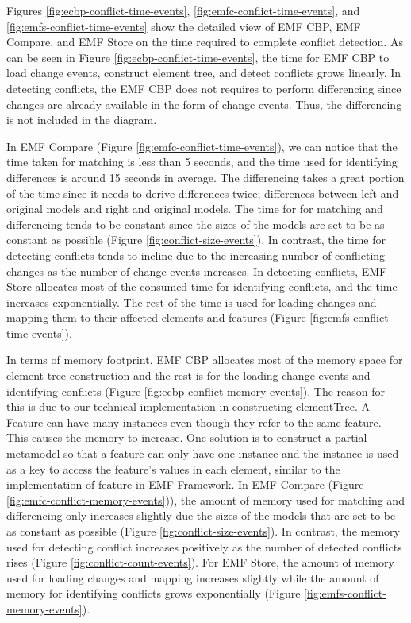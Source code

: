 Figures \ref{fig:ecbp-conflict-time-events}, \ref{fig:emfc-conflict-time-events}, and \ref{fig:emfs-conflict-time-events} show the detailed view of EMF CBP, EMF Compare, and EMF Store on the time required to complete conflict detection. As can be seen in Figure \ref{fig:ecbp-conflict-time-events}, the time for EMF CBP to load change events, construct element tree, and detect conflicts grows linearly. In detecting conflicts, the EMF CBP does not requires to perform differencing since changes are already available in the form of change events. Thus, the differencing is not included in the diagram. 

In EMF Compare (Figure \ref{fig:emfc-conflict-time-events}), we can notice that the time taken for matching is less than 5 seconds, and the time used for identifying differences is around 15 seconds in average. The differencing takes a great portion of the time since it needs to derive differences twice; differences between left and original models and right and original models. The time for for matching and differencing tends to be constant since the sizes of the models are set to be as constant as possible (Figure \ref{fig:conflict-size-events}). In contrast, the time for detecting conflicts tends to incline due to the increasing number of conflicting changes as the number of change events increases. In detecting conflicts, EMF Store allocates most of the consumed time for identifying conflicts, and the time increases exponentially. The rest of the time is used for loading changes and mapping them to their affected elements and features (Figure \ref{fig:emfs-conflict-time-events}). 

In terms of memory footprint, EMF CBP allocates most of the memory space for element tree construction and the rest is for the loading change events and identifying conflicts (Figure \ref{fig:ecbp-conflict-memory-events}). The reason for this is due to our technical implementation in constructing \textsf{elementTree}. A Feature can have many instances even though they refer to the same feature. This causes the memory to increase. One solution is to construct a partial metamodel so that a feature can only have one instance and the instance is used as a key to access the feature's values in each element, similar to the implementation of feature in EMF Framework. In EMF Compare (Figure \ref{fig:emfc-conflict-memory-events})), the amount of memory used for matching and differencing only increases slightly due the sizes of the models that are set to be as constant as possible (Figure \ref{fig:conflict-size-events}). In contrast, the memory used for detecting conflict increases positively as the number of detected conflicts rises (Figure \ref{fig:conflict-count-events}). For EMF Store, the amount of memory used for loading changes and mapping increases slightly while the amount of memory for identifying conflicts grows exponentially (Figure \ref{fig:emfs-conflict-memory-events}).

